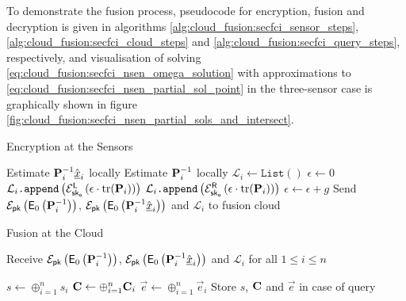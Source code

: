 To demonstrate the fusion process, pseudocode for encryption, fusion and decryption is given in algorithms \ref{alg:cloud_fusion:secfci_sensor_steps}, \ref{alg:cloud_fusion:secfci_cloud_steps} and \ref{alg:cloud_fusion:secfci_query_steps}, respectively, and visualisation of solving \eqref{eq:cloud_fusion:secfci_nsen_omega_solution} with approximations to \eqref{eq:cloud_fusion:secfci_nsen_partial_sol_point} in the three-sensor case is graphically shown in figure \ref{fig:cloud_fusion:secfci_nsen_partial_sols_and_intersect}.
\begin{algorithm}[htbp]
    \caption{Encryption at the Sensors}\label{alg:cloud_fusion:secfci_sensor_steps}
    \begin{algorithmic}[1]
        \State Estimate ${{\mathbf{P}}}_i^{-1}\hat{{\underline{x}}}_i$ locally
        \State Estimate ${{\mathbf{P}}}_i^{-1}$ locally
        \State $\mathcal{L}_i \gets \texttt{List}()$
        \State $\epsilon \gets 0$
                \State $\mathcal{L}_i\texttt{.append}\left(\mathcal{E}_{\mathsf{sk}_{\mathsf{o}}}^{\mathsf{L}}\left(\epsilon\cdot\operatorname{tr}({{\mathbf{P}}}_i)\right)\right)$
            \Else
                \State $\mathcal{L}_i\texttt{.append}\left(\mathcal{E}_{\mathsf{sk}_{\mathsf{o}}}^{\mathsf{R}}\left(\epsilon\cdot\operatorname{tr}({{\mathbf{P}}}_i)\right)\right)$
            \EndIf
            \State $\epsilon \gets \epsilon+g$
        \EndWhile
        \State Send $\mathcal{E}_{\mathsf{pk}}\left(\mathsf{E}_{0}\left({{\mathbf{P}}}_i^{-1}\right)\right)$, $\mathcal{E}_{\mathsf{pk}}\left(\mathsf{E}_{0}\left({{\mathbf{P}}}_i^{-1}\hat{{\underline{x}}}_i\right)\right)$ and $\mathcal{L}_i$ to fusion cloud
        \EndProcedure
    \end{algorithmic}
    \end{algorithm}
    \begin{algorithm}[htbp]
    \caption{Fusion at the Cloud}\label{alg:cloud_fusion:secfci_cloud_steps}
    \begin{algorithmic}[1]
        \State Receive $\mathcal{E}_{\mathsf{pk}}\left(\mathsf{E}_{0}\left({{\mathbf{P}}}_i^{-1}\right)\right)$, $\mathcal{E}_{\mathsf{pk}}\left(\mathsf{E}_{0}\left({{\mathbf{P}}}_i^{-1}\hat{{\underline{x}}}_i\right)\right)$ and $\mathcal{L}_i$ for all $1\leq i \leq n$
        
        \State $s \gets \oplus_{i=1}^{n} s_i$
        \State ${{\mathbf{C}}} \gets \oplus_{i=1}^{n} {{\mathbf{C}}}_i$
        \State $\vec{e} \gets \oplus_{i=1}^{n} \vec{e}_i$
        \State Store $s$, ${{\mathbf{C}}}$ and $\vec{e}$ in case of query
        \EndProcedure
    \end{algorithmic}
    \end{algorithm}
